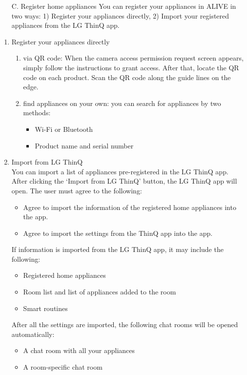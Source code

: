 \documentclass[conference]{IEEEtran}
\begin{document}
\begin{itemize}
    \item [C.] Register home appliances 
    You can register your appliances in ALIVE in two ways: 1) Register your appliances directly, 2) Import your registered appliances from the LG ThinQ app.
\end{itemize}

\begin{enumerate}
    \item Register your appliances directly
    \begin{enumerate}
        \item via QR code: When the camera access permission request screen appears, simply follow the instructions to grant access. After that, locate the QR code on each product. Scan the QR code along the guide lines on the edge.
        \item find appliances on your own: you can search for appliances by two methods:
        \begin{itemize}
            \item Wi-Fi or Bluetooth
            \item Product name and serial number
        \end{itemize}
    \end{enumerate}
    \item Import from LG ThinQ \\
    You can import a list of appliances pre-registered in the LG ThinQ app. After clicking the `Import from LG ThinQ' button, the LG ThinQ app will open. The user must agree to the following:
    \begin{itemize}
        \item Agree to import the information of the registered home appliances into the app.
        \item Agree to import the settings from the ThinQ app into the app.
    \end{itemize}
    If information is imported from the LG ThinQ app, it may include the following:
    \begin{itemize}
        \item Registered home appliances
        \item Room list and list of appliances added to the room
        \item Smart routines
    \end{itemize}
    After all the settings are imported, the following chat rooms will be opened automatically:
    \begin{itemize}
        \item A chat room with all your appliances
        \item A room-specific chat room \\
    \end{itemize} 
\end{enumerate}
\end{document}
